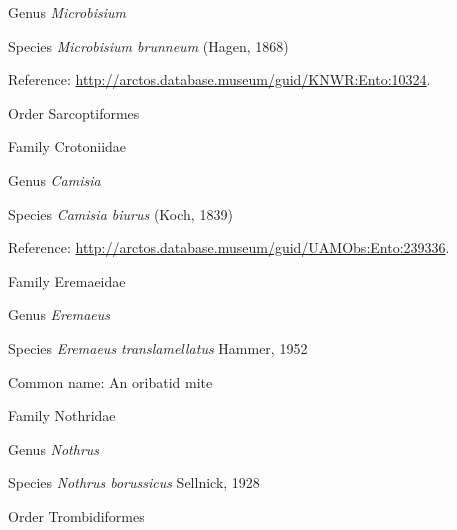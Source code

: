 \documentclass[9pt, article]{memoir}
\begin{document}
\begin{multicols}{2}
\vspace{6pt}\noindent\hspace{30pt}Genus \textit{Microbisium}


\vspace{6pt}\noindent\hspace{36pt}Species \textit{Microbisium brunneum} (Hagen, 1868)


Reference: 
\url{http://arctos.database.museum/guid/KNWR:Ento:10324}.

\vspace{6pt}\noindent\hspace{18pt}Order Sarcoptiformes


\vspace{6pt}\noindent\hspace{24pt}Family Crotoniidae


\vspace{6pt}\noindent\hspace{30pt}Genus \textit{Camisia}


\vspace{6pt}\noindent\hspace{36pt}Species \textit{Camisia biurus} (Koch, 1839)


Reference: 
\url{http://arctos.database.museum/guid/UAMObs:Ento:239336}.

\vspace{6pt}\noindent\hspace{24pt}Family Eremaeidae


\vspace{6pt}\noindent\hspace{30pt}Genus \textit{Eremaeus}


\vspace{6pt}\noindent\hspace{36pt}Species \textit{Eremaeus translamellatus} Hammer, 1952


Common name: An oribatid mite

\vspace{6pt}\noindent\hspace{24pt}Family Nothridae


\vspace{6pt}\noindent\hspace{30pt}Genus \textit{Nothrus}


\vspace{6pt}\noindent\hspace{36pt}Species \textit{Nothrus borussicus} Sellnick, 1928


\vspace{6pt}\noindent\hspace{18pt}Order Trombidiformes



\end{multicols}
\end{document}
